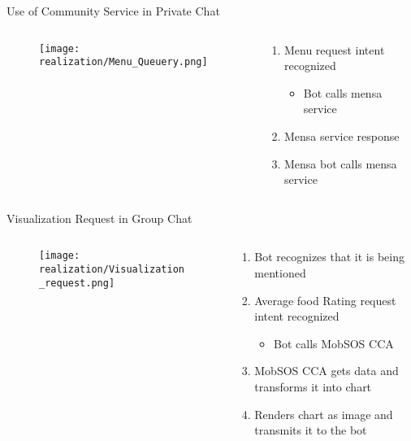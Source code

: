 \begin{frame}{Use of Community Service in Private Chat}
  \begin{columns}
    \begin{column}[]{0.6\textwidth}
      \begin{figure}
        \centering
        \texttt{[image: realization/Menu\_Queuery.png]}

      \end{figure}
    \end{column}
    \begin{column}[]{0.4\textwidth}
      \begin{enumerate}
        \item Menu request intent recognized
              \begin{itemize}
                \item Bot calls mensa service
              \end{itemize}
        \item Mensa service response
        \item Mensa bot calls mensa service
      \end{enumerate}
    \end{column}
  \end{columns}

\end{frame}

\begin{frame}{Visualization Request in Group Chat}
  \begin{columns}
    \begin{column}[]{0.5\textwidth}
      \begin{figure}
        \centering
        \texttt{[image: realization/Visualization\_request.png]}
      \end{figure}
    \end{column}
    \begin{column}[]{0.5\textwidth}
      \begin{enumerate}
        \item Bot recognizes that it is being mentioned
        \item Average food Rating request intent recognized
              \begin{itemize}
                \item Bot calls MobSOS CCA
              \end{itemize}
        \item MobSOS CCA gets data and transforms it into chart
        \item Renders chart as image and transmits it to the bot
      \end{enumerate}
    \end{column}
  \end{columns}
\end{frame}


